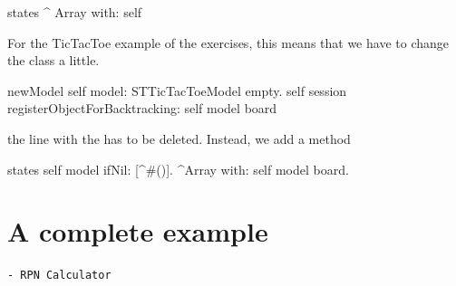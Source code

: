 \documentclass[a4paper,10pt,twoside]{book}
\begin{document}
\begin{code}
states
	^ Array with: self
\end{code}


For the TicTacToe example of the exercises, this means that we have to change
the class  a little.

\begin{code}
newModel
	self model: STTicTacToeModel empty.
	self session registerObjectForBacktracking: self model board
\end{code}

the line with the  has to be deleted. Instead, we add a method 

\begin{code}
states
	self model ifNil: [^#()].
	^Array with: self model board.
\end{code}



\section{A complete example}
\begin{verbatim}
- RPN Calculator
\end{verbatim}



\ifx\wholebook\relax\else 
   
   
\end{document}
